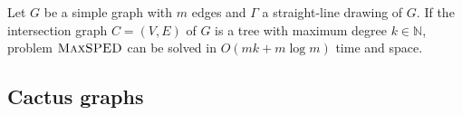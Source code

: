 \documentclass[a4paper,english,numberwithinsect]{eurocg18}
\newcommand{\maxsped}{\ensuremath{\textsc{MaxSPED}}\xspace}
\newcommand{\sollong}{\ensuremath{\textit{long}}\xspace}
\newcommand{\solshort}{\ensuremath{\textit{short}}\xspace}
\begin{document}
\begin{theorem}
	\label{thm:tree}
	Let $ G $ be a simple graph with $m$ edges and $ \Gamma $ a straight-line drawing of $ G $. If the intersection graph $ C = (V,E) $ of $ G $ is a tree with maximum degree $ k \in \mathbb{N} $, problem \maxsped can be solved in $ O(mk + m \log m) $ time and space.
\end{theorem}
%
%
%


\subsection{Cactus graphs}
\label{sec:cactus}
\end{document}
